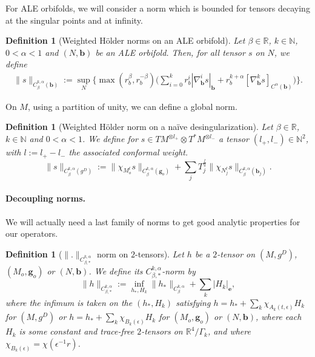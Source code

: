 \documentclass[12pt]{article}
\newtheorem{defn}[thm]{Definition}
\begin{document}
For ALE orbifolds, we will consider a norm which is bounded for tensors decaying at the singular points and at infinity.

\begin{defn}[Weighted Hölder norms on an ALE orbifold]
Let $\beta\in \mathbb{R}$, $k\in\mathbb{N}$, $0<\alpha<1$ and $(N,\mathbf{b})$ be an ALE orbifold. Then, for all tensor $s$ on $N$, we define
   \begin{align*}
       \| s \|_{C^{k,\alpha}_{\beta}(\mathbf{b})}:= \sup_{N}\Big\{\max(r_b^\beta,r_b^{-\beta})\Big( \sum_{i=0}^kr_b^{i}|\nabla_{\mathbf{b}}^i s|_{\mathbf{b}} + r_b^{k+\alpha}[\nabla_{\mathbf{b}}^ks]_{C^\alpha({\mathbf{b}})}\Big)\Big\}.
   \end{align*}
\end{defn}

On $M$, using a partition of unity, we can define a global norm.

\begin{defn}[Weighted Hölder norm on a naïve desingularization]\label{norme a poids M}
		Let $\beta\in \mathbb{R}$, $k\in\mathbb{N}$ and $0<\alpha<1$. We define for $s\in TM^{\otimes l_+}\otimes T^*M^{\otimes l_-}$ a tensor $(l_+,l_-)\in \mathbb{N}^2$, with $l:= l_+-l_-$ the associated conformal weight.
		$$ \|s\|_{C^{k,\alpha}_{\beta}(g^D)}:= \| \chi_{M_o^t} s \|_{C^{k,\alpha}_{\beta}(\mathbf{g}_o)} + \sum_j T_j^\frac{l}{2}\|\chi_{N_{j}^t}s\|_{C^{k,\alpha}_{\beta}(\mathbf{b}_j)}.$$
\end{defn}

\paragraph{Decoupling norms.}

We will actually need a last family of norms to get good analytic properties for our operators.

\begin{defn}[$\|.\|_{C^{k,\alpha}_{\beta,*}}$ norm on $2$-tensors]
    Let $ h $ be a $2$-tensor on $(M,g^D)$, $(M_o,\mathbf{g}_o)$ or $(N,\mathbf{b})$. We define its $C^{k,\alpha}_{\beta,*}$-norm by
    $$\|h\|_{C^{k,\alpha}_{\beta,*}}:= \inf_{h_*,H_k} \|h_*\|_{C^{k,\alpha}_{\beta}} + \sum_k |H_k|_{\mathbf{e}},$$
    where the infimum is taken on the $(h_*,H_k)$ satisfying $h= h_*+\sum_k \chi_{A_k(t,\epsilon)}H_k$ for $(M,g^D)$ or $h= h_*+\sum_k \chi_{B_k(\epsilon)}H_k$ for $(M_o,\mathbf{g}_o)$ or $(N,\mathbf{b})$, where each $H_k$ is some constant and trace-free $2$-tensors on $\mathbb{R}^4\slash\Gamma_k$, and where $\chi_{B_k(\epsilon)}= \chi(\epsilon^{-1}r)$.
\end{defn}
\end{document}
